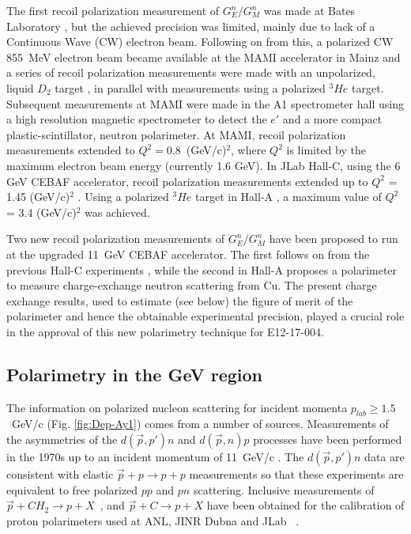 \documentclass[epj]{svjour}
\begin{document}
The first recoil polarization  measurement of $G_{E}^{n}/G_{M}^{n}$ was made
at Bates Laboratory \cite{Eden:1994ji}, but the achieved precision was
limited, mainly due to lack of a Continuous Wave (CW) electron beam.
Following on from this, a polarized CW 855~MeV electron beam became
available at the MAMI accelerator in Mainz and a series of recoil polarization  measurements
were made with an unpolarized, liquid $D_2$ target \cite{Herberg:1999ud,Ostrick:1999xa},
in parallel with measurements using a polarized $^3\!He$ target. 
Subsequent measurements at MAMI were made in the A1 spectrometer hall
\cite{Glazier:2004ny} using a high resolution magnetic spectrometer to detect
the $e'$ and a more compact plastic-scintillator, neutron polarimeter.
At MAMI, recoil polarization  measurements extended to ${Q}^{2}=0.8$~(GeV/c)$^{2}$,
where ${Q}^{2}$ is limited by the maximum electron beam energy (currently
1.6 GeV). In JLab Hall-C, using the 6 GeV CEBAF accelerator, recoil polarization  measurements extended up to $Q^2$ = 1.45 (GeV/c)$^2$ \cite{Plaster:2005cx,Madey:2003av}. Using a polarized $^3\! He$ target in Hall-A \cite{Riordan:2010id}, a maximum value of $Q^2$ = 3.4 (GeV/c)$^2$ was achieved.


Two new recoil polarization  measurements of $G_{E}^{n}/G_{M}^{n}$ have been
proposed to run at the upgraded 11~GeV CEBAF accelerator. The first  
follows on from the previous Hall-C experiments \cite{PR12-11-009}, while the second in Hall-A \cite{PR12-17-004} proposes a polarimeter to measure charge-exchange
neutron scattering from Cu. The present charge exchange results, used to estimate (see below) the figure of merit of the polarimeter and hence the obtainable experimental precision, played a crucial role in the approval of this new polarimetry technique for E12-17-004.
\subsection{Polarimetry in the GeV region}
The information on polarized nucleon scattering for incident momenta $p_{lab}\ge 1.5$~GeV/c (Fig. \ref{fig:Dep-Ay1})
comes from a number of sources. Measurements of the asymmetries of the $d(\vec{p},p')n$ and $d(\vec{p},n)p$
processes have been performed in the 1970s up to an incident momentum of 11~GeV/c \cite{PhysRevLett.35.632,Kramer:1977pf}. The  $d(\vec{p},p')n$ data are consistent with elastic $\vec{p}+ p \to  p+p$
measurements \cite{Spinka:1983rz} so that these experiments are equivalent to free polarized $pp$
and $pn$ scattering. Inclusive measurements of $\vec{p}+CH_{2} \to p+X$~\cite{Azhgirey:2004yk},
and $\vec{p}+ C \to p+X$ have
been obtained for the calibration of proton polarimeters used at ANL,
JINR Dubna and JLab ~\cite{Cheung:1995ei,Alekseev:1999ag}.
\end{document}
